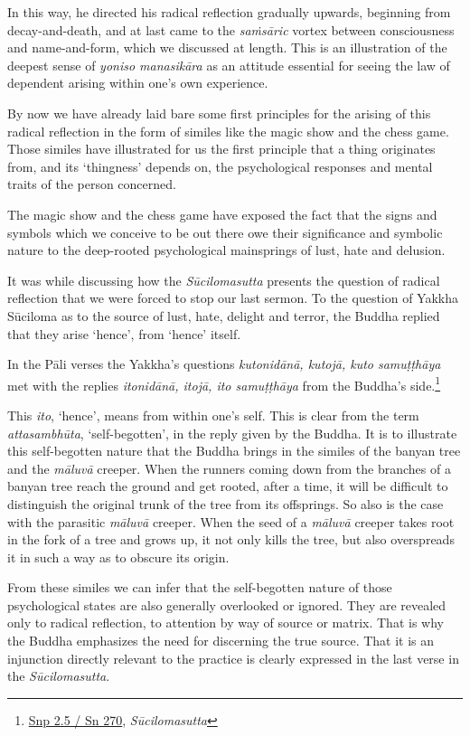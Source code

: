 In this way, he directed his radical reflection gradually upwards, beginning from decay-and-death, and at last came to the \emph{saṁsāric} vortex between consciousness and name-and-form, which we discussed at length. This is an illustration of the deepest sense of \emph{yoniso manasikāra} as an attitude essential for seeing the law of dependent arising within one's own experience.

By now we have already laid bare some first principles for the arising of this radical reflection in the form of similes like the magic show and the chess game. Those similes have illustrated for us the first principle that a thing originates from, and its `thingness' depends on, the psychological responses and mental traits of the person concerned.

The magic show and the chess game have exposed the fact that the signs and symbols which we conceive to be out there owe their significance and symbolic nature to the deep-rooted psychological mainsprings of lust, hate and delusion.

It was while discussing how the \emph{Sūcilomasutta} presents the question of radical reflection that we were forced to stop our last sermon. To the question of Yakkha Sūciloma as to the source of lust, hate, delight and terror, the Buddha replied that they arise `hence', from `hence' itself.

In the Pāli verses the Yakkha's questions \emph{kutonidānā, kutojā, kuto samuṭṭhāya} met with the replies \emph{itonidānā, itojā, ito samuṭṭhāya} from the Buddha's side.\footnote{\href{https://suttacentral.net/snp2.5/pli/ms}{Snp 2.5 / Sn 270}, \emph{Sūcilomasutta}}

This \emph{ito}, `hence', means from within one's self. This is clear from the term \emph{attasambhūta}, `self-begotten', in the reply given by the Buddha. It is to illustrate this self-begotten nature that the Buddha brings in the similes of the banyan tree and the \emph{māluvā} creeper. When the runners coming down from the branches of a banyan tree reach the ground and get rooted, after a time, it will be difficult to distinguish the original trunk of the tree from its offsprings. So also is the case with the parasitic \emph{māluvā} creeper. When the seed of a \emph{māluvā} creeper takes root in the fork of a tree and grows up, it not only kills the tree, but also overspreads it in such a way as to obscure its origin.

From these similes we can infer that the self-begotten nature of those psychological states are also generally overlooked or ignored. They are revealed only to radical reflection, to attention by way of source or matrix. That is why the Buddha emphasizes the need for discerning the true source. That it is an injunction directly relevant to the practice is clearly expressed in the last verse in the \emph{Sūcilomasutta}.

